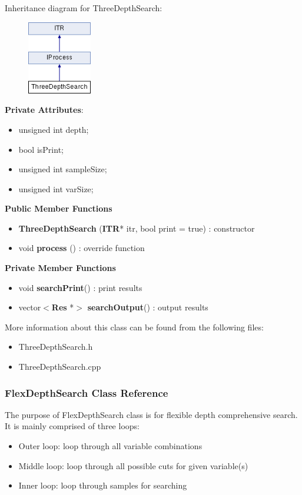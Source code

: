 \documentclass{article}
\begin{document}
Inheritance diagram for ThreeDepthSearch:
\begin{figure}[H]
\centering
\includegraphics[width=0.25\textwidth]{class_three_depth_search.png}
\end{figure}

\textbf{Private Attributes}:
\begin{itemize}
\item unsigned int depth;                
\item bool isPrint;                      
\item unsigned int sampleSize;           
\item unsigned int varSize;                 
\end{itemize}

\textbf{Public Member Functions}
\begin{itemize}
\item \textbf{ThreeDepthSearch} (\textbf{ITR}* itr, bool print = true) : constructor
\item void \textbf{process} () :  override function
\end{itemize}

\textbf{Private Member Functions}
\begin{itemize}    
\item void \textbf{searchPrint}() : print results
\item vector$<$\textbf{Res} *$>$ \textbf{searchOutput}() : output results
\end{itemize}

More information about this class can be found from the following files:
\begin{itemize}
\item ThreeDepthSearch.h
\item ThreeDepthSearch.cpp
\end{itemize}



\subsubsection{FlexDepthSearch Class Reference}
The purpose of FlexDepthSearch class is for flexible depth comprehensive search. It is mainly comprised of three loops: 
\begin{itemize}
\item Outer loop: loop through all variable combinations
\item Middle loop: loop through all possible cuts for given variable(s)
\item Inner loop: loop through samples for searching 
\end{itemize}
\end{document}

